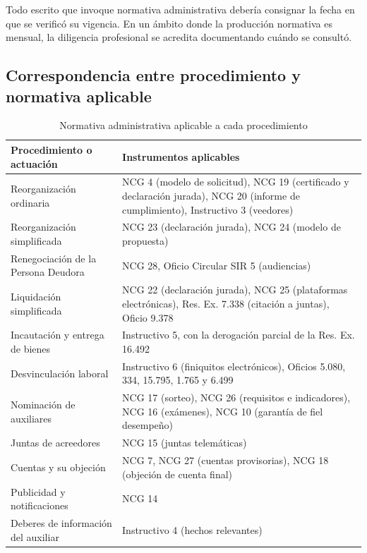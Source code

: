 \begin{practica}
Todo escrito que invoque normativa administrativa debería consignar la fecha en que se
verificó su vigencia. En un ámbito donde la producción normativa es mensual, la
diligencia profesional se acredita documentando cuándo se consultó.
\end{practica}

\subsection{Correspondencia entre procedimiento y normativa aplicable}

\begin{table}[htbp]
\centering
\small
\caption{Normativa administrativa aplicable a cada procedimiento}
\label{tab:normativa-por-procedimiento}
\begin{tabularx}{\textwidth}{@{}>{\raggedright\arraybackslash}p{} X@{}}
\toprule
\textbf{Procedimiento o actuación} & \textbf{Instrumentos aplicables} \\
\midrule
Reorganización ordinaria & NCG 4 (modelo de solicitud), NCG 19 (certificado y declaración
jurada), NCG 20 (informe de cumplimiento), Instructivo 3 (veedores) \\
\addlinespace
Reorganización simplificada & NCG 23 (declaración jurada), NCG 24 (modelo de propuesta) \\
\addlinespace
Renegociación de la Persona Deudora & NCG 28, Oficio Circular SIR 5 (audiencias) \\
\addlinespace
Liquidación simplificada & NCG 22 (declaración jurada), NCG 25 (plataformas
electrónicas), Res. Ex. 7.338 (citación a juntas), Oficio 9.378 \\
\addlinespace
Incautación y entrega de bienes & Instructivo 5, con la derogación parcial de la
Res. Ex. 16.492 \\
\addlinespace
Desvinculación laboral & Instructivo 6 (finiquitos electrónicos), Oficios 5.080, 334,
15.795, 1.765 y 6.499 \\
\addlinespace
Nominación de auxiliares & NCG 17 (sorteo), NCG 26 (requisitos e indicadores), NCG 16
(exámenes), NCG 10 (garantía de fiel desempeño) \\
\addlinespace
Juntas de acreedores & NCG 15 (juntas telemáticas) \\
\addlinespace
Cuentas y su objeción & NCG 7, NCG 27 (cuentas provisorias), NCG 18 (objeción de cuenta
final) \\
\addlinespace
Publicidad y notificaciones & NCG 14 \\
\addlinespace
Deberes de información del auxiliar & Instructivo 4 (hechos relevantes) \\
\bottomrule
\end{tabularx}
\end{table}
